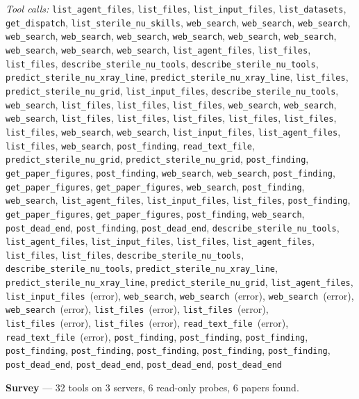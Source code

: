 \documentclass[11pt,a4paper]{article}
\begin{document}
\textit{Tool calls:} \texttt{list\_agent\_files}, \texttt{list\_files}, \texttt{list\_input\_files}, \texttt{list\_datasets}, \texttt{get\_dispatch}, \texttt{list\_sterile\_nu\_skills}, \texttt{web\_search}, \texttt{web\_search}, \texttt{web\_search}, \texttt{web\_search}, \texttt{web\_search}, \texttt{web\_search}, \texttt{web\_search}, \texttt{web\_search}, \texttt{web\_search}, \texttt{web\_search}, \texttt{web\_search}, \texttt{web\_search}, \texttt{list\_agent\_files}, \texttt{list\_files}, \texttt{list\_files}, \texttt{describe\_sterile\_nu\_tools}, \texttt{describe\_sterile\_nu\_tools}, \texttt{predict\_sterile\_nu\_xray\_line}, \texttt{predict\_sterile\_nu\_xray\_line}, \texttt{list\_files}, \texttt{predict\_sterile\_nu\_grid}, \texttt{list\_input\_files}, \texttt{describe\_sterile\_nu\_tools}, \texttt{web\_search}, \texttt{list\_files}, \texttt{list\_files}, \texttt{list\_files}, \texttt{web\_search}, \texttt{web\_search}, \texttt{web\_search}, \texttt{list\_files}, \texttt{list\_files}, \texttt{list\_files}, \texttt{list\_files}, \texttt{list\_files}, \texttt{list\_files}, \texttt{web\_search}, \texttt{web\_search}, \texttt{list\_input\_files}, \texttt{list\_agent\_files}, \texttt{list\_files}, \texttt{web\_search}, \texttt{post\_finding}, \texttt{read\_text\_file}, \texttt{predict\_sterile\_nu\_grid}, \texttt{predict\_sterile\_nu\_grid}, \texttt{post\_finding}, \texttt{get\_paper\_figures}, \texttt{post\_finding}, \texttt{web\_search}, \texttt{web\_search}, \texttt{post\_finding}, \texttt{get\_paper\_figures}, \texttt{get\_paper\_figures}, \texttt{web\_search}, \texttt{post\_finding}, \texttt{web\_search}, \texttt{list\_agent\_files}, \texttt{list\_input\_files}, \texttt{list\_files}, \texttt{post\_finding}, \texttt{get\_paper\_figures}, \texttt{get\_paper\_figures}, \texttt{post\_finding}, \texttt{web\_search}, \texttt{post\_dead\_end}, \texttt{post\_finding}, \texttt{post\_dead\_end}, \texttt{describe\_sterile\_nu\_tools}, \texttt{list\_agent\_files}, \texttt{list\_input\_files}, \texttt{list\_files}, \texttt{list\_agent\_files}, \texttt{list\_files}, \texttt{list\_files}, \texttt{describe\_sterile\_nu\_tools}, \texttt{describe\_sterile\_nu\_tools}, \texttt{predict\_sterile\_nu\_xray\_line}, \texttt{predict\_sterile\_nu\_xray\_line}, \texttt{predict\_sterile\_nu\_grid}, \texttt{list\_agent\_files}, \texttt{list\_input\_files}~(error), \texttt{web\_search}, \texttt{web\_search}~(error), \texttt{web\_search}~(error), \texttt{web\_search}~(error), \texttt{list\_files}~(error), \texttt{list\_files}~(error), \texttt{list\_files}~(error), \texttt{list\_files}~(error), \texttt{read\_text\_file}~(error), \texttt{read\_text\_file}~(error), \texttt{post\_finding}, \texttt{post\_finding}, \texttt{post\_finding}, \texttt{post\_finding}, \texttt{post\_finding}, \texttt{post\_finding}, \texttt{post\_finding}, \texttt{post\_finding}, \texttt{post\_dead\_end}, \texttt{post\_dead\_end}, \texttt{post\_dead\_end}, \texttt{post\_dead\_end}\par
\textbf{Survey} --- 32 tools on 3 servers, 6 read-only probes, 6 papers found.
\end{document}
